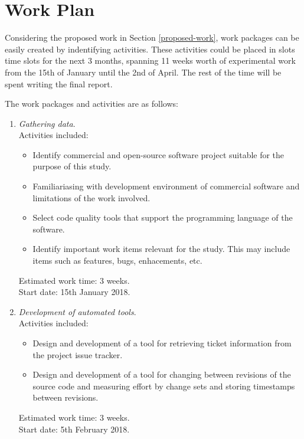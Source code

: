 \documentclass{mprop}
\begin{document}
% 

\section{Work Plan}
\label{work-plan}

Considering the proposed work in Section \ref{proposed-work}, work packages can
be easily created by indentifying activities. These activities could be placed
in slots time slots for the next 3 months, spanning 11 weeks worth of
experimental work from the 15th of January until the 2nd of April. The rest of
the time will be spent writing the final report.

The work packages and activities are as follows:

\begin{enumerate}
	\item \textit{Gathering data}.\\
	Activities included:
	\begin{itemize}
		\item Identify commercial and open-source software project suitable for
		the purpose of this study.
		\item Familiariasing with development environment of commercial software
		and limitations of the work involved.
		\item Select code quality tools that support the programming language of
		the software.
		\item Identify important work items relevant for the study. This may
		include items such as features, bugs, enhacements, etc.
	\end{itemize}

	Estimated work time: 3 weeks.\\
	Start date: 15th January 2018.
	
	\item \textit{Development of automated tools}.\\
	Activities included:
	\begin{itemize}
		\item Design and development of a tool for retrieving ticket information
		from the project issue tracker.
		\item Design and development of a tool for changing between revisions of
		the source code and measuring effort by change sets and storing
		timestamps between revisions.
	\end{itemize}

	Estimated work time: 3 weeks.\\
	Start date: 5th February 2018.


\end{enumerate}
\end{document}
